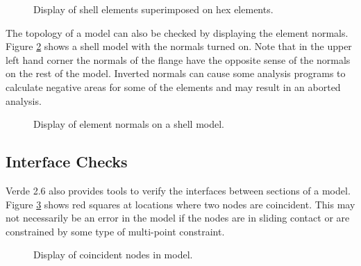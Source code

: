 \documentclass[10pt]{report}
\begin{document}
\htmlrule
\begin{figure}[tbhp]
  \begin{center}
              {}
    \caption{Display of shell elements superimposed on hex elements.}
    \label{fig:quads_on_hexes}
  \end{center}
\end{figure}     
\htmlrule

The topology of a model can also be checked by 
displaying the element normals.  Figure \ref{fig:normals} shows a shell
model with the normals turned on.  Note that in the upper left hand
corner the normals of the flange have the opposite sense of the normals
on the rest of the model.  Inverted normals can cause some analysis 
programs to calculate negative areas for some of the elements and may
result in an aborted analysis.
\htmlrule
\begin{figure}[tbhp]
  \begin{center}
              {}
    \caption{Display of element normals on a shell model.}
    \label{fig:normals}
  \end{center}
\end{figure}     
\htmlrule

\subsection{Interface Checks} 

Verde 2.6 also provides tools to verify the interfaces between
sections of a model.  Figure \ref{fig:coincident_nodes} shows 
red squares at locations where two nodes are coincident.  This may
not necessarily be an error in the model if the nodes are in sliding
contact or are constrained by some type of multi-point constraint.

\htmlrule
\begin{figure}[tbhp]
  \begin{center}
              {}
    \caption{Display of coincident nodes in model.}
    \label{fig:coincident_nodes}
  \end{center}
\end{figure}     
\htmlrule

\end{document}
